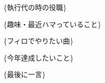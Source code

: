 \documentclass{jlreq}
\begin{document}
\begin{center}
\vspace{0.5cm}

\begin{tcolorbox}[cute, title=\textbf{執行代の時の役職}]
\{執行代の時の役職\}
\end{tcolorbox}

\vspace{0.5cm}

\begin{tcolorbox}[cute, title=\textbf{趣味・最近ハマっていること}]
\{趣味・最近ハマっていること\}
\end{tcolorbox}

\vspace{0.5cm}

\begin{tcolorbox}[cute, title=\textbf{フィロでやりたい曲}]
\{フィロでやりたい曲\}
\end{tcolorbox}

\vspace{0.5cm}

\begin{tcolorbox}[cute, title=\textbf{今年達成したいこと}]
\{今年達成したいこと\}
\end{tcolorbox}

\vspace{0.5cm}

\begin{tcolorbox}[cute, title=\textbf{最後に一言}]
\{最後に一言\}
\end{tcolorbox}

\end{center}
\end{document}
